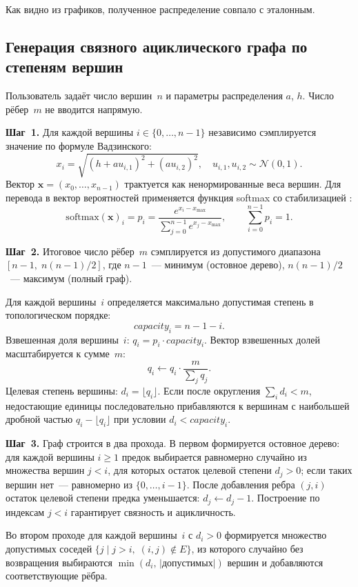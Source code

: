 Как видно из графиков, полученное распределение совпало с эталонным.

\subsection{Генерация связного ациклического графа по степеням вершин}

Пользователь задаёт число вершин~$n$ и параметры распределения $a$, $h$.
Число рёбер~$m$ не вводится напрямую.

\textbf{Шаг~1.} Для каждой вершины $i \in \{0, \ldots, n-1\}$ независимо
сэмплируется значение по формуле Вадзинского:
\[
    x_i = \sqrt{(h + a u_{i,1})^2 + (a u_{i,2})^2},
    \quad u_{i,1}, u_{i,2} \sim \mathcal{N}(0,1).
\]
Вектор $\mathbf{x} = (x_0, \ldots, x_{n-1})$ трактуется как ненормированные
веса вершин. Для перевода в вектор вероятностей применяется функция softmax
со стабилизацией :
\[
    \mathrm{softmax}(\mathbf{x})_i = p_i = \frac{e^{x_i - x_{\max}}}{\sum_{j=0}^{n-1} e^{x_j - x_{\max}}},
    \qquad \sum_{i=0}^{n-1} p_i = 1.
\]

\textbf{Шаг~2.} Итоговое число рёбер~$m$ сэмплируется из допустимого
диапазона $[n-1,\; n(n-1)/2]$, где $n-1$~--- минимум (остовное дерево),
$n(n-1)/2$~--- максимум (полный граф).

Для каждой вершины~$i$ определяется максимально допустимая степень
в топологическом порядке:
\[
    \mathit{capacity}_i = n - 1 - i.
\]
Взвешенная доля вершины~$i$: $q_i = p_i \cdot \mathit{capacity}_i$.
Вектор взвешенных долей масштабируется к сумме~$m$:
\[
    q_i \leftarrow q_i \cdot \frac{m}{\displaystyle\sum_j q_j}.
\]
Целевая степень вершины: $d_i = \lfloor q_i \rfloor$. Если после округления
$\sum_i d_i < m$, недостающие единицы последовательно прибавляются
к вершинам с наибольшей дробной частью $q_i - \lfloor q_i \rfloor$
при условии $d_i < \mathit{capacity}_i$.

\textbf{Шаг~3.} Граф строится в два прохода. В первом формируется
остовное дерево: для каждой вершины $i \geq 1$ предок выбирается
равномерно случайно из множества вершин $j < i$, для которых
остаток целевой степени $d_j > 0$; если таких вершин нет~---
равномерно из $\{0, \ldots, i-1\}$. После добавления ребра $(j, i)$
остаток целевой степени предка уменьшается: $d_j \leftarrow d_j - 1$.
Построение по индексам $j < i$ гарантирует связность и ацикличность.

Во втором проходе для каждой вершины~$i$ с $d_i > 0$ формируется
множество допустимых соседей $\{j \mid j > i,\; (i,j) \notin E\}$,
из которого случайно без возвращения выбираются
$\min(d_i,\,|\text{допустимых}|)$ вершин и добавляются соответствующие рёбра.

